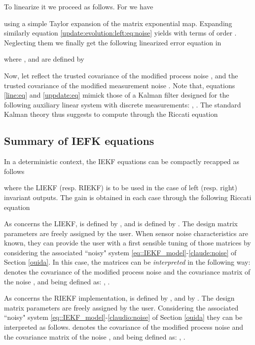 \documentclass[a4paper,12pt,onecolumn]{article}
\begin{document}
To linearize it we proceed as follows. For  we have

using a simple Taylor expansion of the matrix exponential map. Expanding similarly equation \eqref{update:evolution:left:eq:noise} yields 
with  terms of order . 
Neglecting them  we finally get the following linearized error equation in 

where ,  and   are defined by

Now, let  reflect the trusted covariance of the modified process noise , and  the trusted covariance of the modified measurement noise .  
Note that, equations \eqref{line:eq} and \eqref{uppdate:eq} mimick those of a Kalman filter designed for the following auxiliary linear  system with discrete measurements: , . The standard Kalman theory thus suggests to compute  through the Riccati equation 


\subsection{Summary of IEFK equations}
In a deterministic context, the IEKF equations can be compactly recapped as follows

where the LIEKF (resp. RIEKF) is to be used in the case of left (resp. right) invariant outputs. The gain  is obtained in each case through the following Riccati equation


As concerns the LIEKF,  is defined by , and  is defined by .  
The design matrix parameters  are freely assigned by the user. When sensor noise characteristics are known, they can provide the user with a first sensible tuning of those matrices by considering the associated ``noisy" system \eqref{eq::IEKF_model}-\eqref{claude:noise} of Section \ref{ouida}. In this case, the matrices can be \emph{interpreted} in the following way:     denotes the covariance  of the modified process noise  and  the covariance matrix of the noise ,  and  being defined as:
  , .

As concerns the RIEKF implementation,  is defined by , and  by . The design matrix parameters  are freely assigned by the user. Considering the associated ``noisy" system \eqref{eq::IEKF_model}-\eqref{claudio:noise} of Section \ref{ouida} they can be interpreted as follows.  denotes the covariance of the modified process noise    and  the covariance matrix of the noise ,  and  being defined as:
  , .
\end{document}
